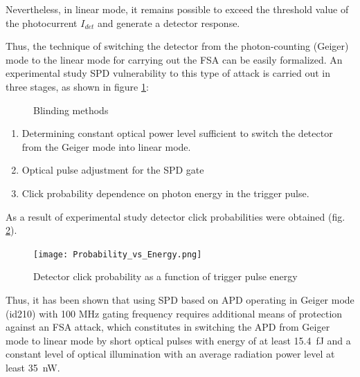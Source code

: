 Nevertheless, in linear mode, it remains possible to exceed the threshold value of the photocurrent $I_{det}$ and generate a detector response.

Thus, the technique of switching the detector from the photon-counting (Geiger) mode to the linear mode for carrying out the FSA can be easily formalized. An experimental study SPD vulnerability to this type of attack is carried out in three stages, as shown in figure \ref{fig:Method_2.3}:
%
 \begin{figure}[ht] 
  \centering
  \caption{Blinding methods}
  \label{fig:Method_2.3}
\end{figure}
%
 \begin{enumerate}
	\item Determining constant optical power level sufficient to switch the detector from the Geiger mode into linear mode.
	\item Optical pulse adjustment for the SPD gate
	\item Click probability dependence on photon energy in the trigger pulse.
\end{enumerate}
%
As a result of experimental study detector click probabilities were obtained (fig. \ref{fig:Probability_vs_Energy}). 

\begin{figure}[ht]
  \centering
  \texttt{[image: Probability\_vs\_Energy.png]}
  \caption{Detector click probability as a function of trigger pulse energy}
  \label{fig:Probability_vs_Energy}
\end{figure}


Thus, it has been shown that using SPD based on APD operating in Geiger mode (id210) with 100 MHz gating frequency requires additional means of protection against an FSA attack, which constitutes in switching the APD from Geiger mode to linear mode by short optical pulses with energy of at least 15.4~fJ and a constant level of optical illumination with an average radiation power level at least 35~nW. 

